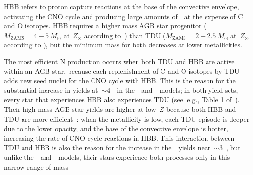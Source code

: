 \documentclass[ms.tex]{subfiles}
\begin{document}
HBB refers to proton capture reactions at the base of the convective envelope,
activating the CNO cycle and producing large amounts of~\Nfourteen~at the
expense of C and O isotopes.
HBB requires a higher mass AGB star progenitor ($M_\text{ZAMS} = 4 - 5~M_\odot$
at~$Z_\odot$ according to~\citealt{Karakas2010}) than TDU
($M_\text{ZAMS} = 2 - 2.5~M_\odot$ at~$Z_\odot$ according to
\citealt{Karakas2010}), but the minimum mass for both decreases at lower
metallicities.
\par
The most efficient N production occurs when both TDU and HBB are active within
an AGB star, because each replenishment of C and O isotopes by TDU adds new
seed nuclei for the CNO cycle with HBB.
This is the reason for the substantial increase in yields at~$\sim$4~\msun~in
the~\karakasten~and~\karakas~models; in both yield sets, every star that
experiences HBB also experiences TDU (see, e.g., Table 1
of~\citealp{Karakas2010}).
Their high mass AGB star yields are higher at low~$Z$ because both HBB and TDU
are more efficient~\citep[see discussion in][]{Ventura2013}: when the
metallicity is low, each TDU episode is deeper due to the lower opacity, and
the base of the convective envelope is hotter, increasing the rate of CNO cycle
reactions in HBB.
This interaction between TDU and HBB is also the reason for the increase in
the~\ventura~yields near~$\sim$3~\msun, but unlike
the~\karakasten~and~\karakas~models, their stars experience both processes only
in this narrow range of mass.
\end{document}
